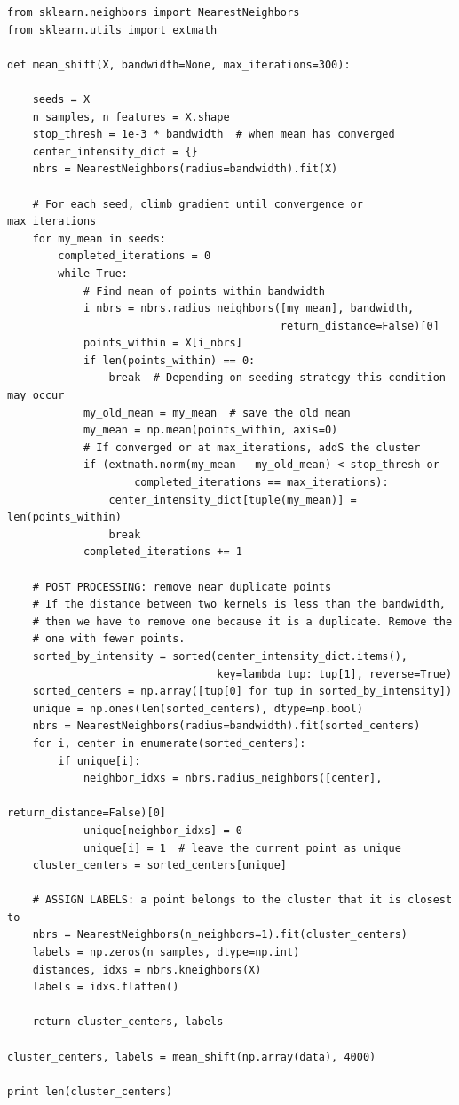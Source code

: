 \documentclass[12pt,fleqn]{article}\usepackage{../../common}
\begin{document}
\begin{verbatim}
from sklearn.neighbors import NearestNeighbors
from sklearn.utils import extmath

def mean_shift(X, bandwidth=None, max_iterations=300):
    
    seeds = X
    n_samples, n_features = X.shape
    stop_thresh = 1e-3 * bandwidth  # when mean has converged
    center_intensity_dict = {}
    nbrs = NearestNeighbors(radius=bandwidth).fit(X)

    # For each seed, climb gradient until convergence or max_iterations
    for my_mean in seeds:
        completed_iterations = 0
        while True:
            # Find mean of points within bandwidth
            i_nbrs = nbrs.radius_neighbors([my_mean], bandwidth,
                                           return_distance=False)[0]
            points_within = X[i_nbrs]
            if len(points_within) == 0:
                break  # Depending on seeding strategy this condition may occur
            my_old_mean = my_mean  # save the old mean
            my_mean = np.mean(points_within, axis=0)
            # If converged or at max_iterations, addS the cluster
            if (extmath.norm(my_mean - my_old_mean) < stop_thresh or
                    completed_iterations == max_iterations):
                center_intensity_dict[tuple(my_mean)] = len(points_within)
                break
            completed_iterations += 1

    # POST PROCESSING: remove near duplicate points
    # If the distance between two kernels is less than the bandwidth,
    # then we have to remove one because it is a duplicate. Remove the
    # one with fewer points.
    sorted_by_intensity = sorted(center_intensity_dict.items(),
                                 key=lambda tup: tup[1], reverse=True)
    sorted_centers = np.array([tup[0] for tup in sorted_by_intensity])
    unique = np.ones(len(sorted_centers), dtype=np.bool)
    nbrs = NearestNeighbors(radius=bandwidth).fit(sorted_centers)
    for i, center in enumerate(sorted_centers):
        if unique[i]:
            neighbor_idxs = nbrs.radius_neighbors([center],
                                                  return_distance=False)[0]
            unique[neighbor_idxs] = 0
            unique[i] = 1  # leave the current point as unique
    cluster_centers = sorted_centers[unique]

    # ASSIGN LABELS: a point belongs to the cluster that it is closest to
    nbrs = NearestNeighbors(n_neighbors=1).fit(cluster_centers)
    labels = np.zeros(n_samples, dtype=np.int)
    distances, idxs = nbrs.kneighbors(X)
    labels = idxs.flatten()
    
    return cluster_centers, labels

cluster_centers, labels = mean_shift(np.array(data), 4000)

print len(cluster_centers)
\end{verbatim}
\end{document}
